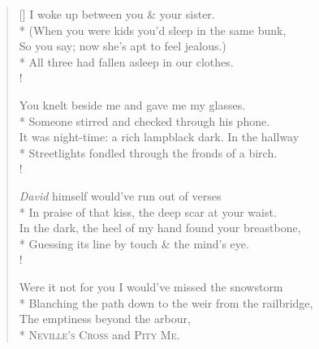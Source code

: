 \settowidth{\versewidth}{It was night-time: a rich lampblack dark. In the hallway m}
\begin{verse}[\versewidth]
I woke up between you \& your sister.\\*
\vin (When you were kids you'd sleep in the same bunk,\\
So you say; now she's apt to feel jealous.)\\*
\vin All three had fallen asleep in our clothes.\\!

You knelt beside me and gave me my glasses.\\*
\vin Someone stirred and checked through his phone.\\
It was night-time: a rich lampblack dark. In the hallway\\*
\vin Streetlights fondled through the fronds of a birch.\\!

\emph{David} himself would've run out of verses\\*
\vin In praise of that kiss, the deep scar at your waist.\\
In the dark, the heel of my hand found your breastbone,\\*
\vin Guessing its line by touch \& the mind's eye.\\!

Were it not for you I would've missed the snowstorm\\*
\vin Blanching the path down to the weir from the railbridge,\\
The emptiness beyond the arbour,\\*
\vin \textsc{Neville}'\textsc{s} \textsc{Cross} and \textsc{Pity Me}.
\end{verse}
